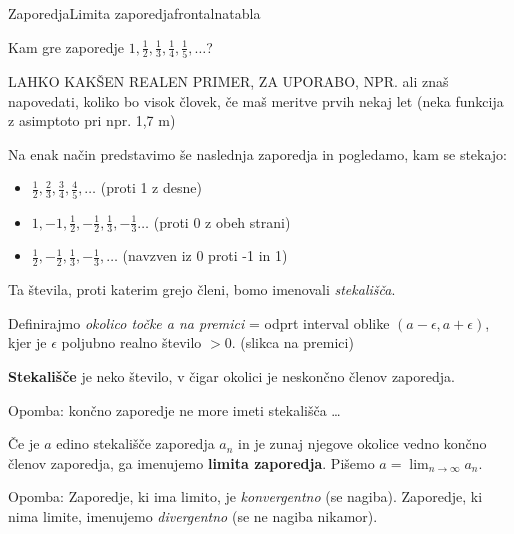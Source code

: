 \begin{priprava}{}{}{Zaporedja}{Limita zaporedja}{frontalna}{tabla}

 Kam gre zaporedje $ 1, \frac{1}{2}, \frac{1}{3}, \frac{1}{4},\frac{1}{5}, \ldots $? 

LAHKO KAKŠEN REALEN PRIMER, ZA UPORABO, NPR. ali znaš napovedati, koliko bo visok človek, če maš meritve prvih nekaj let (neka funkcija z asimptoto pri npr. 1,7 m)

Na enak način predstavimo še naslednja zaporedja in pogledamo, kam se stekajo:
\begin{itemize}
    \item $ \frac{1}{2}, \frac{2}{3}, \frac{3}{4}, \frac{4}{5}, \ldots $  (proti 1 z desne)
    \item $ 1, -1, \frac{1}{2}, -\frac{1}{2}, \frac{1}{3}, -\frac{1}{3} \ldots $ (proti 0 z obeh strani)
    \item $ \frac{1}{2}, -\frac{1}{2}, \frac{1}{3}, -\frac{1}{3}, \ldots $ (navzven iz 0 proti -1 in 1)
\end{itemize}

Ta števila, proti katerim grejo členi, bomo imenovali \emph{stekališča}.

Definirajmo \emph{okolico točke a na premici} = odprt interval oblike $ (a - \epsilon, a + \epsilon) $, kjer je $\epsilon$ poljubno realno število $ > 0 $. (slikca na premici)

\textbf{Stekališče} je neko število, v čigar okolici je neskončno členov zaporedja.

Opomba: končno zaporedje ne more imeti stekališča \ldots

Če je $ a $ edino stekališče zaporedja $ a_n $ in je zunaj njegove okolice vedno končno členov zaporedja, ga imenujemo \textbf{limita zaporedja}. Pišemo $ a = \lim_{n \rightarrow \infty} a_n $. 

Opomba: Zaporedje, ki ima limito, je \emph{konvergentno} (se nagiba). Zaporedje, ki nima limite, imenujemo \emph{divergentno} (se ne nagiba nikamor).


\end{priprava}
